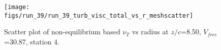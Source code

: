 \begin{figure}[H]
\centering
\texttt{[image: figs/run\_39/run\_39\_turb\_visc\_total\_vs\_r\_meshscatter]}
\caption{Scatter plot of non-equilibrium based $\nu_T$ vs radius at $z/c$=8.50, $V_{free}$=30.87, station 4.}
\label{fig:run_39_turb_visc_total_vs_r_meshscatter}
\end{figure}


